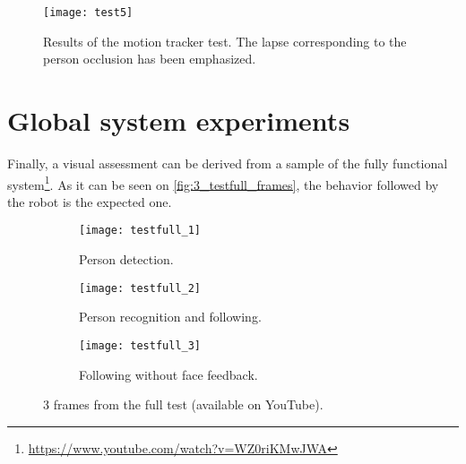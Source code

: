 \begin{figure}[h]
	\centering
	\texttt{[image: test5]}
	\caption{Results of the motion tracker test. The lapse corresponding to the person occlusion has been emphasized.}
	\label{fig:3_test5}
\end{figure}



\section{Global system experiments}
\label{sec:3_global_experiment}
Finally, a visual assessment can be derived from a sample of the fully functional system\footnote{\url{https://www.youtube.com/watch?v=WZ0riKMwJWA}}. As it can be seen on \autoref{fig:3_testfull_frames}, the behavior followed by the robot is the expected one.

\begin{figure}[h]
	\centering
	\begin{subfigure}[t]{0.3\linewidth}
		\centering
		\texttt{[image: testfull\_1]}
		\caption{Person detection.}
	\end{subfigure}
	\begin{subfigure}[t]{0.3\linewidth}
		\centering
		\texttt{[image: testfull\_2]}
		\caption{Person recognition and following.}
	\end{subfigure}
	\begin{subfigure}[t]{0.3\linewidth}
		\centering
		\texttt{[image: testfull\_3]}
		\caption{Following without face feedback.}
	\end{subfigure}
	\caption{3 frames from the full test (available on YouTube).}
	\label{fig:3_testfull_frames}
\end{figure}



